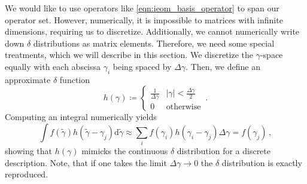 \documentclass[
    reprint, 
    aps,
    preprintnumbers,
    twocolumn,
    prb,
    superscriptaddress
]{revtex4-2}
\begin{document}
We would like to use operators like \eqref{eqn:ieom_basis_operator} to span our operator set.
However, numerically, it is impossible to matrices with infinite dimensions, requiring us to discretize.
Additionally, we cannot numerically write down $\delta$ distributions as matrix elements. Therefore, we need some special treatments, which we will describe in this section.
We discretize the $\gamma$-space equally with each abscissa $\gamma_i$ being spaced by $\Delta \gamma$.
Then, we define an approximate $\delta$ function
\begin{equation}
    h(\gamma) \coloneqq \begin{cases}
        \frac{1}{\Delta \gamma} & |\gamma| < \frac{\Delta \gamma}{2} \\ 0 & \text{otherwise}
    \end{cases}\,.
\end{equation}
Computing an integral numerically yields
\begin{equation}
    \int f(\tilde{\gamma}) h(\tilde{\gamma} - \gamma_j) \mathrm{d} \tilde{\gamma} \approx \sum_i f(\gamma_i) h(\gamma_i - \gamma_j) \Delta \gamma = f(\gamma_j)\,,
\end{equation}
showing that $h(\gamma)$ mimicks the continuous $\delta$ distribution for a discrete description.
Note, that if one takes the limit $\Delta \gamma \to 0$ the $\delta$ distribution is exactly reproduced.
\end{document}
